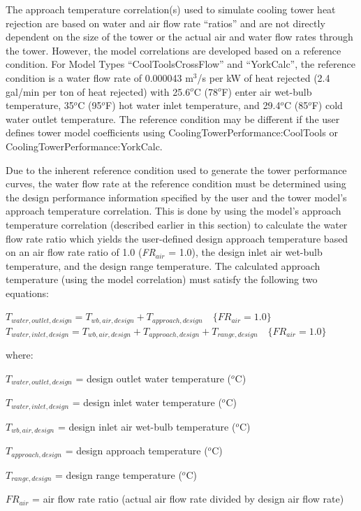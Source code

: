 The approach temperature correlation(s) used to simulate cooling tower heat rejection are based on water and air flow rate ``ratios'' and are not directly dependent on the size of the tower or the actual air and water flow rates through the tower. However, the model correlations are developed based on a reference condition. For Model Types ``CoolToolsCrossFlow'' and ``YorkCalc'', the reference condition is a water flow rate of 0.000043 m\(^{3}\)/s per kW of heat rejected (2.4 gal/min per ton of heat rejected) with 25.6\(^{o}\)C (78\(^{o}\)F) enter air wet-bulb temperature, 35\(^{o}\)C (95\(^{o}\)F) hot water inlet temperature, and 29.4\(^{o}\)C (85\(^{o}\)F) cold water outlet temperature. The reference condition may be different if the user defines tower model coefficients using CoolingTowerPerformance:CoolTools or CoolingTowerPerformance:YorkCalc.

Due to the inherent reference condition used to generate the tower performance curves, the water flow rate at the reference condition must be determined using the design performance information specified by the user and the tower model's approach temperature correlation. This is done by using the model's approach temperature correlation (described earlier in this section) to calculate the water flow rate ratio which yields the user-defined design approach temperature based on an air flow rate ratio of 1.0 (\emph{FR\(_{air}\)} = 1.0), the design inlet air wet-bulb temperature, and the design range temperature. The calculated approach temperature (using the model correlation) must satisfy the following two equations:

\({T_{water,outlet,design}} = {T_{wb,air,design}} + {T_{approach,design}}\quad \{ F{R_{air}} = 1.0\}\) \({T_{water,inlet,design}} = {T_{wb,air,design}} + {T_{approach,design}} + {T_{range,design}}\quad \{ F{R_{air}} = 1.0\}\)

where:

\({T_{water,outlet,design}}\) = design outlet water temperature (\(^{o}\)C)

\({T_{water,inlet,design}}\) = design inlet water temperature (\(^{o}\)C)

\({T_{wb,air,design}}\) = design inlet air wet-bulb temperature (\(^{o}\)C)

\({T_{approach,design}}\) = design approach temperature (\(^{o}\)C)

\({T_{range,design}}\) = design range temperature (\(^{o}\)C)

\(F{R_{air}}\) = air flow rate ratio (actual air flow rate divided by design air flow rate)

